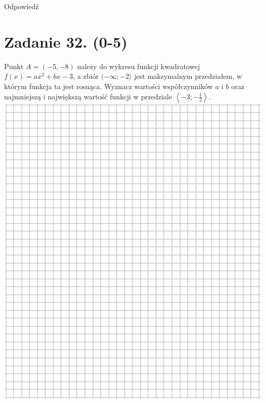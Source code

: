 \documentclass[10pt]{article}
\begin{document}
Odpowiedź \(\qquad\)

\section*{Zadanie 32. (0-5)}
Punkt \(A=(-5,-8)\) należy do wykresu funkcji kwadratowej \(f(x)=a x^{2}+b x-3\), a zbiór \((-\infty ;-2\rangle\) jest maksymalnym przedziałem, w którym funkcja ta jest rosnąca. Wyznacz wartości współczynników \(a\) i \(b\) oraz najmniejszą i największą wartość funkcji w przedziale \(\left\langle-3 ;-\frac{1}{2}\right\rangle\).\\
\includegraphics[max width=\textwidth, center]{2024_11_21_ba65d61981011633d840g-16}
\end{document}
